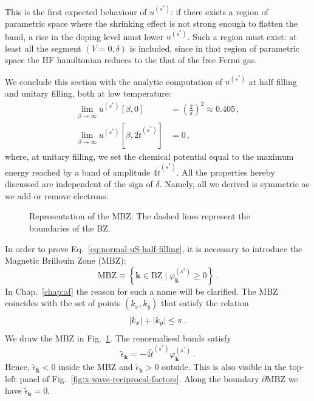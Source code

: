 This is the first expected behaviour of $u^{(s^*)}$: if there exists a region of parametric space where the shrinking effect is not strong enough to flatten the band, a rise in the doping level must lower $u^{(s^*)}$. Such a region must exist: at least all the segment $(V=0,\delta)$ is included, since in that region of parametric space the HF hamiltonian reduces to the that of the free Fermi gas.

We conclude this section with the analytic computation of $u^{(s^*)}$ at half filling and unitary filling, both at low temperature:
\begin{align}
	\lim_{\beta \to \infty} u^{(s^*)}[\beta,0] &= \left( \frac{2}{\pi} \right)^2 \approx 0.405  \, , \label{eq:normal-uS-half-filling} \\
	\lim_{\beta \to \infty} u^{(s^*)}\left[
	\beta,2\tilde{t}^{(s^*)}
	\right] &= 0 \, , \label{eq:normal-uS-unitary-filling}
\end{align}
where, at unitary filling, we set the chemical potential equal to the maximum energy reached by a band of amplitude $4\tilde{t}^{(s^*)}$. All the properties hereby discussed are independent of the sign of $\delta$. Namely, all we derived is symmetric as we add or remove electrons.

\begin{figure}
	\centering
	
	\caption{Representation of the MBZ. The dashed lines represent the boundaries of the BZ.}
	\label{fig:normal-MBZ}
\end{figure}

In order to prove Eq.~\eqref{eq:normal-uS-half-filling}, it is necessary to introduce the Magnetic Brillouin Zone (MBZ):
\begin{equation}\label{eq:MBZ-def}
	\mathrm{MBZ} \equiv \left\lbrace
	\mathbf{k}\in\mathrm{BZ}
	\mid 
	\varphi_\mathbf{k}^{(s^*)} \ge 0
	\right\rbrace \, .
\end{equation}
In Chap.~\ref{chap:af} the reason for such a name will be clarified. The MBZ coincides with the set of points $(k_x,k_y)$ that satisfy the relation
\[
	\abs{k_x} + \abs{k_y} \le \pi \, .
\]
We draw the MBZ in Fig.~\ref{fig:normal-MBZ}. The renormalised bands satisfy
\[
	\tilde{\epsilon}_\mathbf{k} = - 4 \tilde{t}^{(s^*)} \varphi_\mathbf{k}^{(s^*)} \, .
\]
Hence, $\tilde{\epsilon}_\mathbf{k}<0$ inside the MBZ and $\tilde{\epsilon}_\mathbf{k}>0$ outside. This is also visible in the top-left panel of Fig.~\ref{fig:x-wave-reciprocal-factors}. Along the boundary $\partial \mathrm{MBZ}$ we have $\tilde{\epsilon}_\mathbf{k}=0$.

